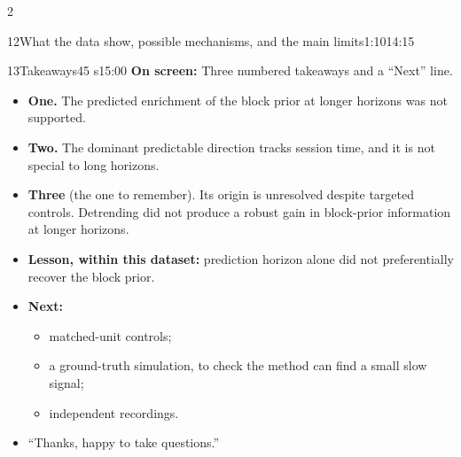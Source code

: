 \documentclass[10pt]{article}
\newcommand{\point}[1]{{\color{ink}\textbf{On screen:} #1}\par}
\begin{document}
\begin{multicols}{2}
\begin{slidebox}{12}{What the data show, possible mechanisms, and the main limits}{1:10}{14:15}
\end{slidebox}
\begin{slidebox}{13}{Takeaways}{45 s}{15:00}
\point{Three numbered takeaways and a ``Next'' line.}
\begin{itemize}
\item \textbf{One.} The predicted enrichment of the block prior at longer horizons was not supported.
\item \textbf{Two.} The dominant predictable direction tracks session time, and it is not special to long horizons.
\item \textbf{Three} (the one to remember). Its origin is unresolved despite targeted controls. Detrending did not
produce a robust gain in block-prior information at longer horizons.
\item \textbf{Lesson, within this dataset:} prediction horizon alone did not preferentially recover the block prior.
\item \textbf{Next:}
  \begin{itemize}
  \item matched-unit controls;
  \item a ground-truth simulation, to check the method can find a small slow signal;
  \item independent recordings.
  \end{itemize}
\item ``Thanks, happy to take questions.''
\end{itemize}

\end{slidebox}

\end{multicols}

\newpage
\end{document}
